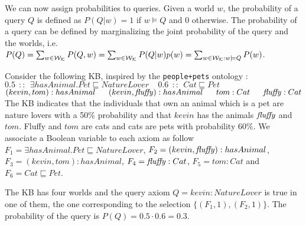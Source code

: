 We can now assign probabilities to queries. 
Given a world $w$, the probability of a query $Q$ is defined as $P(Q|w)=1$ if $w\models Q$ and 0 otherwise.
The probability of a query can be defined by marginalizing the joint probability of the query and the worlds, i.e.
$P(Q)=\sum_{w\in \mathcal{W}_{\cal K}}P(Q,w)=\sum_{w\in \mathcal{W}_{\cal K}} P(Q|w)p(w)=\sum_{w\in \mathcal{W}_{\cal K}: w\models Q}P(w)$.

\begin{example}
	\label{people+petsxy}
	\begin{small}
		Consider the following KB, inspired by the \texttt{people+pets} ontology  \cite{ISWC03-tut}:
		{\center $0.5\ \ ::\ \ \exists hasAnimal.Pet \sqsubseteq NatureLover\ \ \ \ \ 0.6\ \ ::\ \ Cat\sqsubseteq Pet$\\
			$(kevin,tom):hasAnimal\ \ \ \ \ (kevin,\fluffy):hasAnimal\ \ \ \ \ tom: Cat\ \ \ \ \ \fluffy: Cat$\\}
		\noindent The KB indicates that the individuals that own an animal which is a pet are nature lovers with a 50\% probability and that $kevin$ has the animals 
		${\mathit{fluffy}}$ and $tom$.  Fluffy and $tom$ are cats and cats are pets with probability 60\%.
		We associate a Boolean variable to each axiom as follow
		$F_1 = \exists hasAnimal.Pet \sqsubseteq NatureLover$, $F_2=(kevin,{\mathit{fluffy}}):hasAnimal$, $F_3=(kevin,tom):hasAnimal$, $F_4={\mathit{fluffy}}: Cat$, $F_5=tom: Cat$ and $F_6= Cat\sqsubseteq Pet$.
		
		
		The KB has four worlds and the query axiom $Q=kevin:NatureLover$ is true in one of them, the one corresponding to the selection 
		$
		\{(F_1,1),(F_2,1)\}
		$.
		The probability of the query is $P(Q)=0.5\cdot 0.6=0.3$.
	\end{small}
\end{example}

